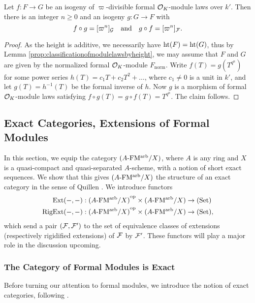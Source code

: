 \documentclass[../main.tex]{subfiles}
\begin{document}
\begin{lem}\label{lem:inverseqisog}
  Let $f: F \to G$ be an isogeny of $\varpi$-divisible formal $\mathcal{O}_K$-module laws
  over $k'$. Then there is an 
  integer $n \geq 0$ and an isogeny $g: G \to F$ with 
  \begin{equation*}
    f \circ g = [\varpi^n]_{\mathcal{G}} \quad \text{and} \quad g \circ f = [\varpi^n]_{\mathcal{F}}.
  \end{equation*}
  \begin{proof}[Proof]
    As the height is additive, we necessarily have 
    $\textnormal{ht}(F) = \textnormal{ht}(G)$, thus by Lemma
    \ref{prop:classificationofmodulelawsbyheight}, we may assume that $F$ and
    $G$ are given by the normalized formal $\mathcal{O}_K$-module
    $F_\mathrm{norm}$.
    Write $f(T) = g(T^{q^n})$ for some power series $h(T) = c_1 T + c_2T^2 +
    \dots$, where $c_1 \neq 0$ is a unit in $k'$, and let $g(T) = h^{-1}(T)$ be the 
    formal inverse of $h$. Now $g$ is a morphism of formal $\mathcal{O}_K$-module laws
    satisfying $f \circ g(T) = g\circ f(T) = T^{q^n}$. The claim follows.
  \end{proof}
\end{lem}


\subsection{Exact Categories, Extensions of Formal Modules} %
 \label{sub:Exact Categories Extensions of Formal Modules}

In this section, we equip the category ${({A}\text-\allowbreak\mathrm{FM^{arb}}/{X})}$, where 
$A$ is any ring and $X$ is a quasi-compact and quasi-separated $A$-scheme,
with a notion of short exact sequences. We show that this gives ${({A}\text-\allowbreak\mathrm{FM^{arb}}/{X})}$ 
the structure of an exact category in the sense of 
Quillen \cite[Appendix A]{keller1990chain}. We introduce functors
\begin{align*}
  \operatorname{Ext}(-,-)&: {({A}\text-\allowbreak\mathrm{FM^{arb}}/{X})}^{\mathrm{op}} \times {({A}\text-\allowbreak\mathrm{FM^{arb}}/{X})} \to {(\mathrm{Set})} \\
  \operatorname {RigExt}(-,-)&: {({A}\text-\allowbreak\mathrm{FM^{arb}}/{X})}^{\mathrm{op}} \times {({A}\text-\allowbreak\mathrm{FM^{arb}}/{X})} \to {(\mathrm{Set})},
\end{align*}
which send a pair $(\mathcal{F}, \mathcal{F}')$ to the set of equivalence classes of 
extensions (respectively rigidified extensions) of $\mathcal{F}$ by $\mathcal{F}'$. These functors
will play a major role in the discussion upcoming.

\subsubsection{The Category of Formal Modules is Exact} %
\label{ssub:The Category of Formal Modules is Exact}
Before turning our attention to formal modules, we introduce the notion of 
exact categories, following \cite[Appendix A]{keller1990chain}.
\end{document}
